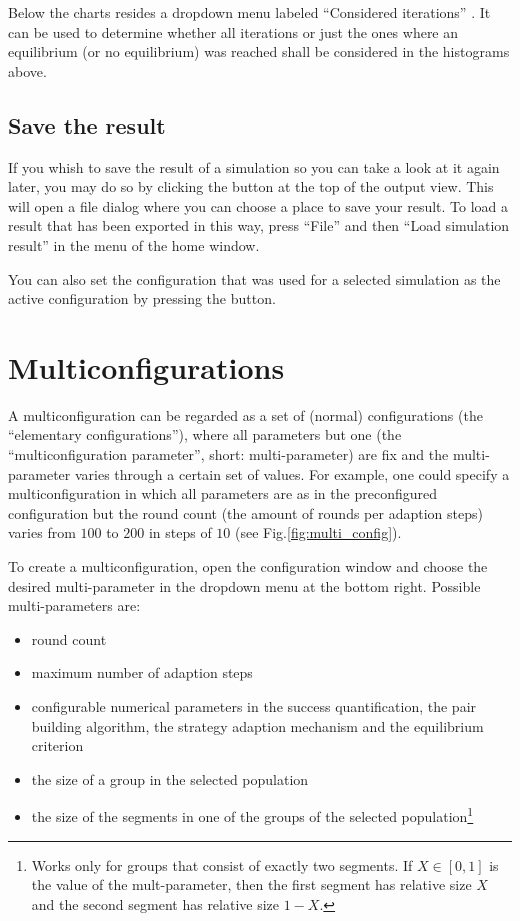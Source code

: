 \documentclass[parskip=full,11pt]{scrartcl}
\newcommand*\circled[1]{\tikz[baseline=(char.base)]{
            \node[shape=circle,draw,inner sep=2pt] (char) {#1};}}
\newlength\myheight
\newlength\mydepth
\newcommand*\inlinegraphics[1]{%
  \settototalheight\myheight{Xygp}%
  \settodepth\mydepth{Xygp}%
  \raisebox{-1.8\mydepth}{\texttt{[image: \#1]}}%
}
\begin{document}
Below the charts resides a dropdown menu labeled \enquote{Considered iterations} \circled{4}. It can be used to determine whether all iterations or just the ones where an equilibrium (or no equilibrium) was reached shall be considered in the histograms above.

\subsection{Save the result}
If you whish to save the result of a simulation so you can take a look at it again later, you may do so by clicking the  \inlinegraphics{img_manual/export_button.png} button at the top of the output view. This will open a file dialog where you can choose a place to save your result. To load a result that has been exported in this way, press \enquote{File} and then \enquote{Load simulation result} in the menu of the home window.

You can also set the configuration that was used for a selected simulation as the active configuration by pressing the  \inlinegraphics{img_manual/rotate_right_button.png} button.

\pagebreak
\section{Multiconfigurations}\label{sec:multi_config}
A multiconfiguration can be regarded as a set of (normal) configurations (the \enquote{elementary configurations}), where all parameters but one (the \enquote{multiconfiguration parameter}, short: multi-parameter) are fix and the multi-parameter varies through a certain set of values. For example, one could specify a multiconfiguration in which all parameters are as in the preconfigured configuration but the round count (the amount of rounds per adaption steps) varies from \(100\) to \(200\) in steps of \(10\) (see Fig.\ref{fig:multi_config}).

To create a multiconfiguration, open the configuration window and choose the desired multi-parameter in the dropdown menu at the bottom right. Possible multi-parameters are:
\begin{itemize}
\item round count
\item maximum number of adaption steps
\item configurable numerical parameters in the success quantification, the pair building algorithm, the strategy adaption mechanism and the equilibrium criterion
\item the size of a group in the selected population
\item the size of the segments in one of the groups of the selected population\footnote{Works only for groups that consist of exactly two segments. If \(X \in [0,1]\) is the value of the mult-parameter, then the first segment has relative size \(X\) and the second segment has relative size \(1 - X\).}
\end{itemize}
\end{document}
